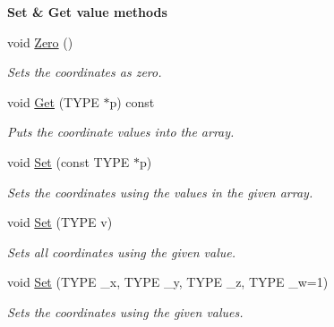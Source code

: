 \begin{Indent}\textbf{ Set \& Get value methods}\par
\begin{DoxyCompactItemize}
\item 
\mbox{\label{classcy_1_1_point4_ac6b511e23ae61d959cc612a28e781408}} 
void \mbox{\hyperlink{classcy_1_1_point4_ac6b511e23ae61d959cc612a28e781408}{Zero}} ()
\begin{DoxyCompactList}\small\item\em Sets the coordinates as zero. \end{DoxyCompactList}\item 
\mbox{\label{classcy_1_1_point4_a154f859d2d39f3fa8c3cba1d63ff9761}} 
void \mbox{\hyperlink{classcy_1_1_point4_a154f859d2d39f3fa8c3cba1d63ff9761}{Get}} (T\+Y\+PE $\ast$p) const
\begin{DoxyCompactList}\small\item\em Puts the coordinate values into the array. \end{DoxyCompactList}\item 
\mbox{\label{classcy_1_1_point4_a7799953e23649cc40fda5b6b5c75c76c}} 
void \mbox{\hyperlink{classcy_1_1_point4_a7799953e23649cc40fda5b6b5c75c76c}{Set}} (const T\+Y\+PE $\ast$p)
\begin{DoxyCompactList}\small\item\em Sets the coordinates using the values in the given array. \end{DoxyCompactList}\item 
\mbox{\label{classcy_1_1_point4_a4728cd518c7525e5a6e19482d30e0eb5}} 
void \mbox{\hyperlink{classcy_1_1_point4_a4728cd518c7525e5a6e19482d30e0eb5}{Set}} (T\+Y\+PE v)
\begin{DoxyCompactList}\small\item\em Sets all coordinates using the given value. \end{DoxyCompactList}\item 
\mbox{\label{classcy_1_1_point4_aa31d1b6b8860b1e6d41a22add3fdae27}} 
void \mbox{\hyperlink{classcy_1_1_point4_aa31d1b6b8860b1e6d41a22add3fdae27}{Set}} (T\+Y\+PE \+\_\+x, T\+Y\+PE \+\_\+y, T\+Y\+PE \+\_\+z, T\+Y\+PE \+\_\+w=1)
\begin{DoxyCompactList}\small\item\em Sets the coordinates using the given values. \end{DoxyCompactList}\end{DoxyCompactItemize}
\end{Indent}
